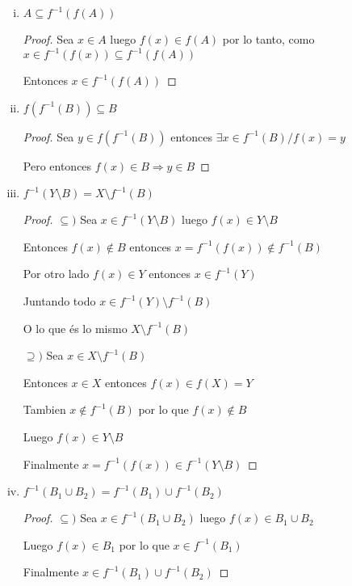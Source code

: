 \documentclass[12pt]{article}
\newcommand{\Ra}{\Rightarrow}
\theoremstyle{definition}
\begin{document}
\begin{enumerate}[i.]
  \item $A \subseteq f^{-1} (f(A))$
    \begin{proof}
      
      Sea $x \in A$ luego $f(x) \in f(A)$ por lo tanto, como $ x\in f^{-1}(f(x)) \subseteq f^{-1}(f(A))$  
    
    Entonces $x \in f^{-1}(f(A)) $ 
  \end{proof}
  \item $f(f^{-1}(B)) \subseteq B$
    \begin{proof}
      Sea $y \in f(f^{-1}(B))$ entonces $\exists x \in f^{-1}(B) / f(x) = y$

      Pero entonces $f(x) \in B \Ra y \in B$
    \end{proof}
     
  \item $f^{-1}(Y \setminus B) = X \setminus f^{-1}(B)$
    \begin{proof}
      $\subseteq )$ Sea $x \in f^{-1}(Y \setminus B)$ luego $f(x) \in Y \setminus B$

      Entonces $f(x) \notin B$ entonces $x = f^{-1}(f(x)) \notin f^{-1}(B) $

      Por otro lado $f(x) \in Y$ entonces $x \in f^{-1}(Y)$

      Juntando todo $x \in f^{-1}(Y) \setminus f^{-1}(B)$

      O lo que és lo mismo $X \setminus f^{-1}(B)$

      $\supseteq )$ Sea $x \in X \setminus f^{-1}(B)$ 

      Entonces $x \in X$ entonces $f(x) \in f(X)=Y $

      Tambien $x \notin f^{-1}(B)$ por lo que $f(x) \notin B$

      Luego $f(x) \in Y \setminus B$

      Finalmente $x = f^{-1}(f(x)) \in f^{-1}(Y \setminus B)$
     \end{proof}

   \item $f^{-1}(B_{1} \cup B_{2}) = f^{-1}(B_{1}) \cup f^{-1}(B_{2})$
      \begin{proof}
        $\subseteq )$ Sea $ x \in f^{-1}(B_{1} \cup B_{2})$ luego $f(x) \in B_{1} \cup B_{2}$

	Luego $f(x) \in B_{1}$ por lo que $x \in f^{-1}(B_{1})$

	Finalmente $x \in f^{-1}(B_{1}) \cup f^{-1}(B_{2})$


\end{proof}
\end{enumerate}
\end{document}

